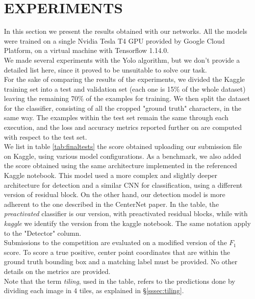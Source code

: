 \section{EXPERIMENTS}
\label{sec:experiments}

In this section we present the results obtained with our networks. All the models were trained on a single Nvidia Tesla T4 GPU provided by Google Cloud Platform, on a virtual machine with Tensorflow 1.14.0. \\
We made several experiments with the Yolo algorithm, but we don't provide a detailed list here, since it proved to be unsuitable to solve our task.\\
For the sake of comparing the results of the experiments, we divided the Kaggle training set into a test and validation set (each one is 15\% of the whole dataset) leaving the remaining 70\% of the examples for training. We then split the dataset for the classifier, consisting of all the cropped "ground truth" characters, in the same way. The examples within the test set remain the same through each execution, and the loss and accuracy metrics reported further on are computed with respect to the test set.\\
We list in table \ref{tab:finaltests} the score obtained uploading our submission file on Kaggle, using various model configurations. As a benchmark, we also added the score obtained using the same architecture implemented in the referenced Kaggle notebook. This model used a more complex and slightly deeper architecture for detection and a similar CNN for classification, using a different version of residual block. On the other hand, our detection model is more adherent to the one described in the CenterNet paper. In the table, the \textit{preactivated} classifier is our version, with preactivated residual blocks, while with \textit{kaggle} we identify the version from the kaggle notebook. The same notation apply to the "Detector" column.\\
Submissions to the competition are evaluated on a modified version of the $F_1$ score. To score a true positive, center point coordinates that are within the ground truth bounding box and a matching label must be provided. No other details on the metrics are provided.\\ Note that the term \textit{tiling}, used in the table, refers to the predictions done by dividing each image in 4 tiles, as explained in §\ref{sssec:tiling}.

